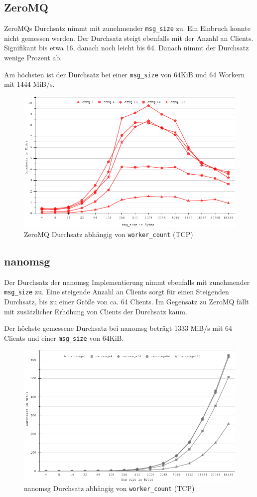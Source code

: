 \documentclass{article}
\begin{document}
\subsection{ZeroMQ}

ZeroMQs Durchsatz nimmt mit zunehmender \texttt{msg\_size} zu. Ein
Einbruch konnte nicht gemessen werden. Der Durchsatz steigt 
ebenfalls mit der Anzahl an Clients. Signifikant bis etwa 16, 
danach noch leicht bis 64. Danach nimmt der Durchsatz wenige Prozent ab.

Am höchsten ist der Durchsatz bei einer \texttt{msg\_size} von 64KiB und 64 Workern mit 1444 MiB/s. 

\begin{figure}[htbp]
\centering
\includegraphics[width=12cm]{images/chart(1).png}
\caption{ZeroMQ Durchsatz abhängig von \texttt{worker\_count} (TCP)}
\end{figure}

\subsection{nanomsg}

Der Durchsatz der nanomsg Implementierung nimmt ebenfalls mit
zunehmender \texttt{msg\_size} zu. Eine steigende Anzahl an Clients sorgt für einen Steigenden Durchsatz, bis zu einer Größe von ca. 64 Clients. Im Gegensatz zu ZeroMQ fällt mit
zusätzlicher Erhöhung von Clients der Durchsatz kaum.

Der höchste gemessene Durchsatz bei nanomsg beträgt 1333 MiB/s mit 64
Clients und einer \texttt{msg\_size} von 64KiB.

\begin{figure}[htbp]
\centering
\includegraphics[width=12cm]{images/chart(2).png}
\caption{nanomsg Durchsatz abhängig von \texttt{worker\_count} (TCP)}
\end{figure}
\end{document}
